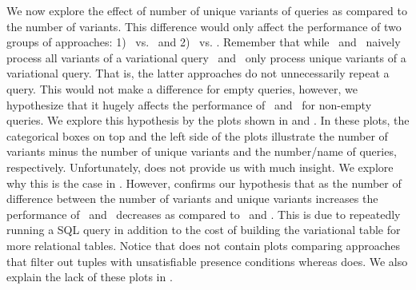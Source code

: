 We now explore the effect of number of unique variants of queries as compared to the
number of variants. This difference would only affect the performance of two groups of 
approaches: 1) \nbf\ vs. \ubf\ and 2) \nbfi\ vs. \ubfi. 
%
Remember that while \nbf\ and \nbfi\ naively process all variants of a variational query
\ubf\ and \ubfi\ only process unique variants of a variational query. That is, the latter approaches
do not unnecessarily repeat a query. This would not make a difference for empty queries, however,
we hypothesize that it hugely affects the performance of \nbf\ and \nbfi\ for non-empty queries. 
%
We explore this hypothesis by the plots shown in  and .
In these plots, the categorical boxes on top and the left side of the plots illustrate
the number of variants minus the number of unique variants and the number/name of queries, respectively.
%
Unfortunately,  does not provide us with much insight. We explore why this 
is the case in . However,  confirms our hypothesis that
as the number of difference between the number of variants and unique variants increases the 
performance of \nbf\ and \nbfi\ decreases as compared to \ubf\ and \ubfi. This is due to repeatedly
running a SQL query in addition to the cost of building the variational table for more relational 
tables. 
%
Notice that  does not contain plots comparing approaches that filter out
tuples with unsatisfiable presence conditions whereas   does. 
We also explain the lack of these plots in .


